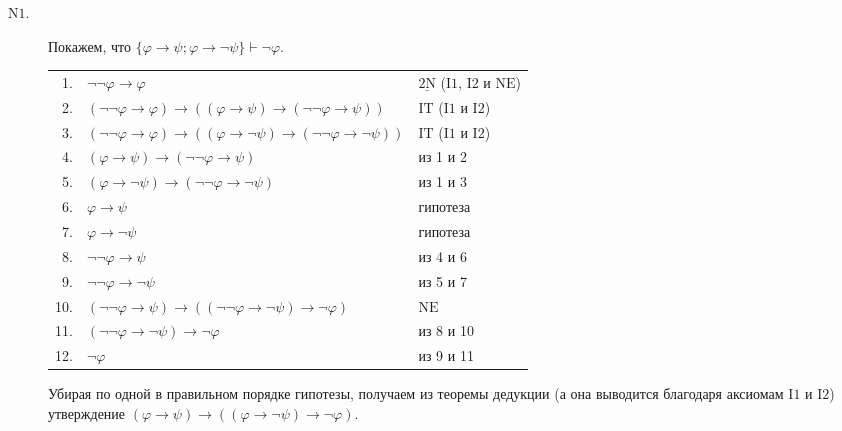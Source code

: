 \documentclass[12pt,a4paper]{article}
\begin{document}
\begin{enumproblem}
\begin{enumerate}
\begin{description}
                    \item[$\mathrm{N1}$.] Покажем, что $\{\varphi \rightarrow \psi; \varphi \rightarrow \neg \psi\} \vdash \neg \varphi$.
                        \begin{center}
                            \begin{tabular}{rll}
                                1.& $\neg \neg \varphi \rightarrow \varphi$& $\underline{\mathrm{2N}}$ ($\mathrm{I1}$, $\mathrm{I2}$ и $\mathrm{NE}$)\\
                                2.& $(\neg \neg \varphi \rightarrow \varphi) \rightarrow ((\varphi \rightarrow \psi) \rightarrow (\neg \neg \varphi \rightarrow \psi))$& $\mathrm{IT}$ ($\mathrm{I1}$ и $\mathrm{I2}$)\\
                                3.& $(\neg \neg \varphi \rightarrow \varphi) \rightarrow ((\varphi \rightarrow \neg \psi) \rightarrow (\neg \neg \varphi \rightarrow \neg \psi))$& $\mathrm{IT}$ ($\mathrm{I1}$ и $\mathrm{I2}$)\\
                                4.& $(\varphi \rightarrow \psi) \rightarrow (\neg \neg \varphi \rightarrow \psi)$& из 1 и 2\\
                                5.& $(\varphi \rightarrow \neg \psi) \rightarrow (\neg \neg \varphi \rightarrow \neg \psi)$& из 1 и 3\\
                                6.& $\varphi \rightarrow \psi$& гипотеза\\
                                7.& $\varphi \rightarrow \neg \psi$& гипотеза\\
                                8.& $\neg \neg \varphi \rightarrow \psi$& из 4 и 6\\
                                9.& $\neg \neg \varphi \rightarrow \neg \psi$& из 5 и 7\\
                                10.& $(\neg \neg \varphi \rightarrow \psi) \rightarrow ((\neg \neg \varphi \rightarrow \neg \psi) \rightarrow \neg \varphi)$& $\mathrm{NE}$\\
                                11.& $(\neg \neg \varphi \rightarrow \neg \psi) \rightarrow \neg \varphi$& из 8 и 10\\
                                12.& $\neg \varphi$& из 9 и 11\\
                            \end{tabular}
                        \end{center}
                        Убирая по одной в правильном порядке гипотезы, получаем из теоремы дедукции (а она выводится благодаря аксиомам $\mathrm{I1}$ и $\mathrm{I2}$) утверждение $(\varphi \rightarrow \psi) \rightarrow ((\varphi \rightarrow \neg \psi) \rightarrow \neg \varphi)$.
                \end{description}
        \end{enumerate}
    \end{enumproblem}
\end{document}
